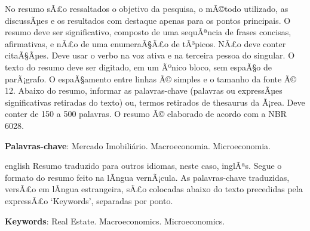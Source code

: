 \documentclass[
	12pt,				%
	oneside,			%
	a4paper,			%
	chapter=TITLE,		%
	section=TITLE,		%
	english,			%
	brazil				%
	]{abntex2}
\begin{document}
\setlength{\absparsep}{18pt} %
\begin{resumo}
	\SingleSpacing
  No resumo sÃ£o ressaltados o objetivo da pesquisa, o mÃ©todo utilizado, as discussÃµes e os resultados com destaque apenas para os pontos principais. O resumo deve ser significativo, composto de uma sequÃªncia de frases concisas, afirmativas, e nÃ£o de uma enumeraÃ§Ã£o de tÃ³picos. NÃ£o deve conter citaÃ§Ãµes. Deve usar o verbo na voz ativa e na terceira pessoa do singular. O texto do resumo deve ser digitado, em um Ãºnico bloco, sem espaÃ§o de parÃ¡grafo. O espaÃ§amento entre linhas Ã© simples e o tamanho da fonte Ã© 12. Abaixo do resumo, informar as palavras-chave (palavras ou expressÃµes significativas retiradas do texto) ou, termos retirados de thesaurus da Ã¡rea. Deve conter de 150 a 500 palavras. O resumo Ã© elaborado de acordo com a NBR 6028. 
  
  \textbf{Palavras-chave}: 
    Mercado Imobiliário.
    Macroeconomia.
    Microeconomia.
  \end{resumo}
\begin{resumo}[Abstract]
	\SingleSpacing
	\begin{otherlanguage*}{english}
		Resumo traduzido para outros idiomas, neste caso, inglÃªs. Segue o formato do resumo feito na lÃ­ngua vernÃ¡cula. As palavras-chave traduzidas, versÃ£o em lÃ­ngua estrangeira, sÃ£o colocadas abaixo do texto precedidas pela expressÃ£o `Keywords', separadas por ponto.
		
		\textbf{Keywords}:
	      Real Estate.
        Macroeconomics.
        Microeconomics.
    	\end{otherlanguage*}
\end{resumo}
% 
%
%  
\end{document}
